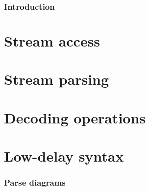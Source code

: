 
\section{Introduction}


\clearpage
\part{Stream access}\label{streamaccess}
\clearpage
\part{Stream parsing}\label{streamparsing}
\clearpage
\part{Decoding operations}\label{decodingops}
\clearpage
\part{Low-delay syntax}




\appendix

\clearpage
\section{Parse diagrams}

